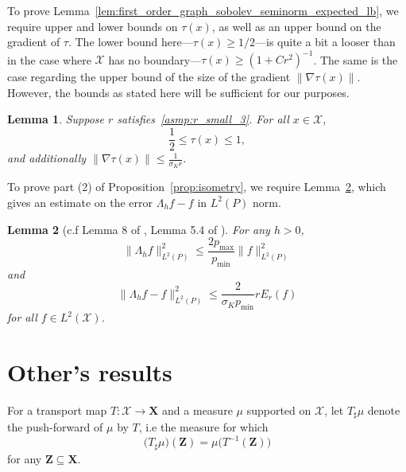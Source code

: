 \documentclass{article}
\newcommand{\1}{\mathbf{1}}
\newcommand{\Xset}{\mathcal{X}}
\newcommand{\Leb}{L}
\theoremstyle{alden}
\theoremstyle{aldenthm}
\newtheorem{lemma}{Lemma}
\theoremstyle{definition}
\theoremstyle{remark}
\begin{document}
To prove Lemma~\ref{lem:first_order_graph_sobolev_seminorm_expected_lb}, we require upper and lower bounds on $\tau(x)$, as well as an upper bound on the gradient of $\tau$. The lower bound here---$\tau(x) \geq 1/2$---is quite a bit a looser than in the case where $\Xset$ has no boundary---$\tau(x) \geq (1 + Cr^2)^{-1}$. The same is the case regarding the upper bound of the size of the gradient $\|\nabla \tau(x)\|$. However, the bounds as stated here will be sufficient for our purposes.
\begin{lemma}
	\label{lem:tau_bound}
	Suppose $r$ satisfies~\ref{asmp:r_small_3}. For all $x \in \Xset$,
	\begin{equation*}
	\frac{1}{2} \leq \tau(x) \leq 1,
	\end{equation*}
	and additionally $\|\nabla \tau(x)\| \leq \frac{1}{\sigma_K r}$.
\end{lemma}

To prove part (2) of Proposition~\ref{prop:isometry}, we require Lemma~\ref{lem:smoothening_error}, which gives an estimate on the error $\Lambda_h f - f$ in $\Leb^2(P)$ norm.
\begin{lemma}[c.f Lemma 8 of \cite{trillos2019}, Lemma 5.4 of \cite{burago2014}]
	\label{lem:smoothening_error}
	For any $h > 0$, 
	\begin{equation}
	\label{eqn:smoothening_error_norm}
	\bigl\|\Lambda_hf\bigr\|_{\Leb^2(P)}^2 \leq \frac{2p_{\max}}{p_{\min}} \bigl\|f\bigr\|_{\Leb^2(P)}^2
	\end{equation}
	and
	\begin{equation}
	\label{eqn:smoothening_error_energy}
	\bigl\|\Lambda_hf - f\bigr\|_{\Leb^2(P)}^2 \leq \frac{2}{\sigma_Kp_{\min}} r E_r(f)
	\end{equation}
	for all $f \in \Leb^2(\Xset)$.
\end{lemma}

\section{Other's results}

For a transport map $T: \Xset \to \mathbf{X}$ and a measure $\mu$ supported on $\Xset$, let $T_{\sharp}\mu$ denote the push-forward of $\mu$ by $T$, i.e the measure for which
\begin{equation*}
\bigl(T_{\sharp}\mu\bigr)(\mathbf{Z}) = \mu\bigl(T^{-1}(\mathbf{Z}))
\end{equation*}
for any $\mathbf{Z} \subseteq \mathbf{X}$.
\end{document}
